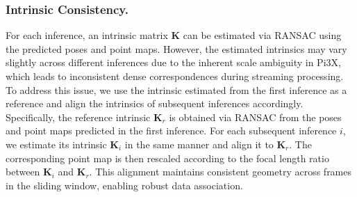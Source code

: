 \subsubsection{Intrinsic Consistency.}
For each inference, an intrinsic matrix $\mathbf{K}$ can be estimated via RANSAC using the predicted poses and point maps. However, the estimated intrinsics may vary slightly across different inferences due to the inherent scale ambiguity in Pi3X, which leads to inconsistent dense correspondences during streaming processing. To address this issue, we use the intrinsic estimated from the first inference as a reference and align the intrinsics of subsequent inferences accordingly. Specifically, the reference intrinsic $\mathbf{K}_r$ is obtained via RANSAC from the poses and point maps predicted in the first inference. For each subsequent inference $i$, we estimate its intrinsic $\mathbf{K}_i$ in the same manner and align it to $\mathbf{K}_r$. The corresponding point map is then rescaled according to the focal length ratio between $\mathbf{K}_i$ and $\mathbf{K}_r$. This alignment maintains consistent geometry across frames in the sliding window, enabling robust data association.

